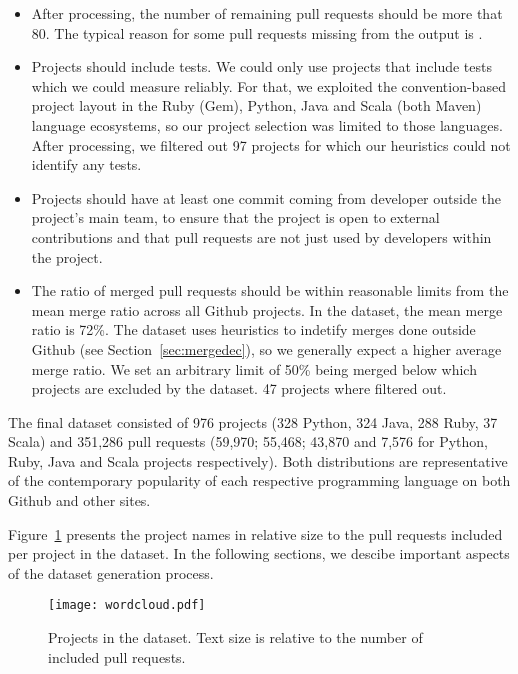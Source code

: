 \documentclass{sig-alternate}
\begin{document}
\begin{itemize}

  \item After processing, the number of remaining pull requests should be more
    that 80. The typical reason for some pull requests missing from the output
    is   . 

  \item Projects should include tests. We could only use projects that include
    tests which we could measure reliably. For that, we exploited the
    convention-based project layout in the Ruby (Gem), Python, Java and Scala
    (both Maven) language ecosystems, so our project selection was limited to
    those languages. After processing, we filtered out 97 projects for which
    our heuristics could not identify any tests.
    
  \item Projects should have at least one commit coming from developer outside
    the project's main team, to ensure that the project is open to external
    contributions and that pull requests are not just used by developers within
    the project.

  \item The ratio of merged pull requests should be within reasonable limits
    from the mean merge ratio across all Github projects. In the \ghtorrent
    dataset, the mean merge ratio is 72\%. The \pullreq dataset uses heuristics
    to indetify merges done outside Github (see Section~\ref{sec:mergedec}), so
    we generally expect a higher average merge ratio. We set an arbitrary limit
    of 50\% being merged below which projects are excluded by the dataset. 47
    projects where filtered out.

\end{itemize}

The final dataset consisted of 976 projects (328 Python, 324 Java, 288 Ruby, 37
Scala) and 351,286 pull requests (59,970; 55,468; 43,870 and 7,576 for Python,
Ruby, Java and Scala projects respectively). Both distributions are
representative of the contemporary popularity of each respective programming
language on both Github and other sites.

Figure~\ref{fig:wordcloud} presents the project names in relative size to the
pull requests included per project in the dataset. In the following sections, we descibe important aspects of the dataset generation process.

\begin{figure}
  \begin{center}
    \texttt{[image: wordcloud.pdf]}
  \end{center}
  \caption{Projects in the \pullreq dataset. Text size is relative to the number of
  included pull requests.}
  \label{fig:wordcloud}
\end{figure}
\end{document}

